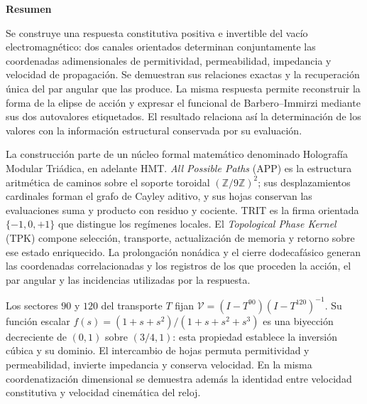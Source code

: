 \begin{center}\bfseries Resumen\end{center}
{}
\begingroup
\fontsize{9.5}{10.7}\selectfont
\setlength{\parskip}{1.5pt plus .5pt minus .5pt}
\fontsize{10.2}{11.6}\selectfont
\setlength{\parskip}{1pt plus .5pt minus .5pt}
\enlargethispage{2\baselineskip}
\noindent
Se construye una respuesta constitutiva positiva e invertible del vacío
electromagnético: dos canales orientados determinan conjuntamente las
coordenadas adimensionales de permitividad, permeabilidad, impedancia y
velocidad de propagación. Se demuestran sus relaciones exactas y la
recuperación única del par angular que las produce. La misma respuesta
permite reconstruir la forma de la elipse de acción y expresar el
funcional de Barbero--Immirzi mediante sus dos autovalores etiquetados.
El resultado relaciona así la determinación de los valores con la
información estructural conservada por su evaluación.

La construcción parte de un núcleo formal matemático denominado
Holografía Modular Triádica, en adelante HMT. \emph{All Possible Paths}
(APP) es la estructura aritmética de caminos sobre el soporte toroidal
$(\mathbb Z/9\mathbb Z)^2$; sus desplazamientos cardinales forman el
grafo de Cayley aditivo, y sus hojas conservan las evaluaciones suma y
producto con residuo y cociente. TRIT es la firma orientada
$\{-1,0,+1\}$ que distingue los regímenes locales. El
\emph{Topological Phase Kernel} (TPK) compone selección, transporte,
actualización de memoria y retorno sobre ese estado enriquecido. La
prolongación nonádica y el cierre dodecafásico generan las coordenadas
correlacionadas y los registros de los que proceden la acción, el par
angular y las incidencias utilizadas por la respuesta.

Los sectores $90$ y $120$ del transporte $T$ fijan
$\mathcal V=(I-T^{90})(I-T^{120})^{-1}$. Su función escalar
$f(s)=(1+s+s^2)/(1+s+s^2+s^3)$ es una biyección decreciente de $(0,1)$
sobre $(3/4,1)$: esta propiedad establece la inversión cúbica y su
dominio. El intercambio de hojas permuta permitividad y permeabilidad,
invierte impedancia y conserva velocidad. En la misma coordenatización dimensional
se demuestra además la identidad entre velocidad constitutiva y
velocidad cinemática del reloj.

